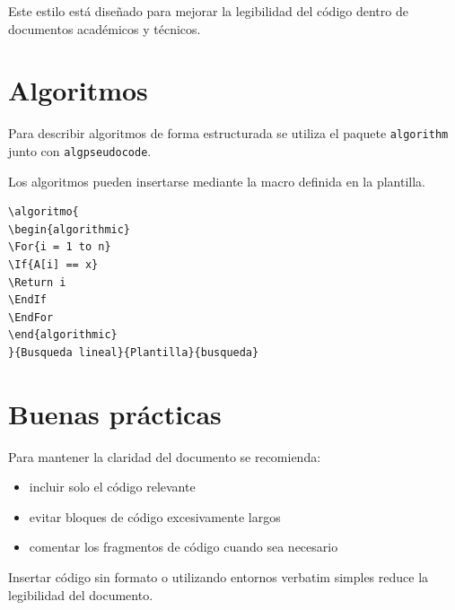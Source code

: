 \begin{examplebox}
Este estilo está diseñado para mejorar la
legibilidad del código dentro de documentos
académicos y técnicos.
\end{examplebox}




\section{Algoritmos}

Para describir algoritmos de forma estructurada
se utiliza el paquete \texttt{algorithm} junto con
\texttt{algpseudocode}.

Los algoritmos pueden insertarse mediante la macro
definida en la plantilla.

\begin{lstlisting}[caption={Ejemplo de algoritmo},label={code:algorithmexample}]
\algoritmo{
\begin{algorithmic}
\For{i = 1 to n}
\If{A[i] == x}
\Return i
\EndIf
\EndFor
\end{algorithmic}
}{Busqueda lineal}{Plantilla}{busqueda}
\end{lstlisting}





\section{Buenas prácticas}

Para mantener la claridad del documento se recomienda:

\begin{itemize}

\item incluir solo el código relevante
\item evitar bloques de código excesivamente largos
\item comentar los fragmentos de código cuando sea necesario

\end{itemize}



\begin{warningbox}
Insertar código sin formato o utilizando
entornos verbatim simples reduce la
legibilidad del documento.
\end{warningbox}
